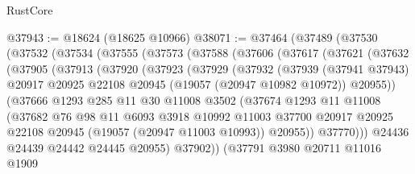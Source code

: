 \begin{lexlean}{RustCore}
\begin{coremodule}
@37943 := @18624 (@18625 @10966)
@38071 := @37464
    (@37489
      (@37530
        (@37532
          (@37534
            (@37555
              (@37573
                (@37588
                  (@37606
                    (@37617
                      (@37621
                        (@37632
                          (@37905
                            (@37913
                              (@37920
                                (@37923
                                  (@37929
                                    (@37932
                                      (@37939
                                        (@37941 @37943)
                                        @20917
                                        @20925
                                        @22108
                                        @20945
                                        (@19057 (@20947 @10982 @10972))
                                        @20955))
                                    (@37666
                                      @1293
                                      @285
                                      @11
                                      @30
                                      @11008
                                      @3502
                                      (@37674
                                        @1293
                                        @11
                                        @11008
                                        (@37682
                                          @76
                                          @98
                                          @11
                                          @6093
                                          @3918
                                          @10992
                                          @11003
                                          @37700
                                          @20917
                                          @20925
                                          @22108
                                          @20945
                                          (@19057 (@20947 @11003 @10993))
                                          @20955))
                                      @37770)))
                                @24436
                                @24439
                                @24442
                                @24445
                                @20955)
                              @37902))
                          (@37791
                            @3980
                            @20711
                            @11016
                            @1909

\end{coremodule}
\end{lexlean}

